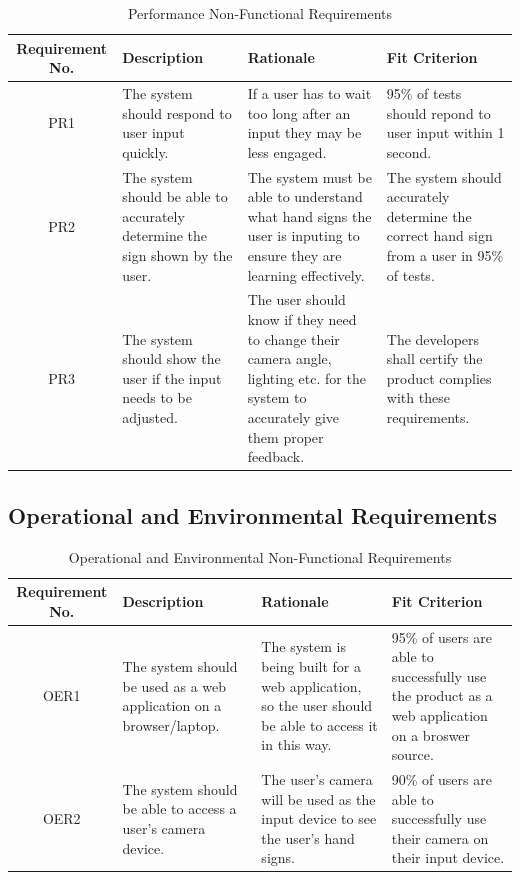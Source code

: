 \documentclass[12pt, titlepage]{article}
\begin{document}
\begin{table}[H]
\caption{Performance Non-Functional Requirements}
\noindent \begin{tabular}{| c | p{3cm}| p{3cm}| p{3cm}|}
\hline 
\textbf{Requirement No.} & \textbf{Description} & \textbf{Rationale} & \textbf{Fit Criterion}\\
\hline
PR1 & The system should respond to user input quickly. & If a user has to wait too long after an input they may be less engaged. & 95\% of tests should repond to user input within 1 second. \\
\hline
PR2 & The system should be able to accurately determine the sign shown by the user. & The system must be able to understand what hand signs the user is inputing to ensure they are learning effectively. & The system should accurately determine the correct hand sign from a user in 95\% of tests. \\
\hline
PR3 & The system should show the user if the input needs to be adjusted. & The user should know if they need to change their camera angle, lighting etc. for the system to accurately give them proper feedback. & The developers shall certify the product complies with these requirements.\\
\bottomrule
\end{tabular}
\end{table}

\subsection{Operational and Environmental Requirements}

\begin{table}[H]
\caption{Operational and Environmental Non-Functional Requirements}
\noindent \begin{tabular}{| c | p{3cm}| p{3cm}| p{3cm}|}
\hline 
\textbf{Requirement No.} & \textbf{Description} & \textbf{Rationale} & \textbf{Fit Criterion}\\
\hline
OER1 & The system should be used as a web application on a browser/laptop. & The system is being built for a web application, so the user should be able to access it in this way. & 95\% of users are able to successfully use the product as a web application on a broswer source. \\
\hline
OER2 & The system should be able to access a user's camera device. & The user's camera will be used as the input device to see the user's hand signs. & 90\% of users are able to successfully use their camera on their input device. \\
\bottomrule
\end{tabular}
\end{table}
\end{document}
